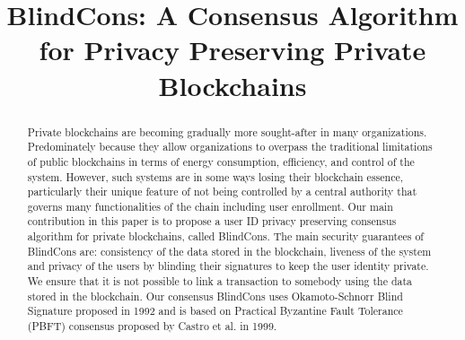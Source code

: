 \documentclass[conference]{IEEEtran}
\newcommand{\name}{BlindCons}
\begin{document}
\title{\name{}: A Consensus Algorithm for Privacy Preserving Private Blockchains\\}

\author{
\and
{}
\and
{}
\and
{}
}

\maketitle


\begin{abstract}
Private blockchains are becoming gradually more sought-after in many organizations. Predominately because they allow organizations to overpass the traditional limitations of public blockchains in terms of energy consumption, efficiency, and control of the system. However, such systems are in some ways losing their blockchain essence, particularly their unique feature of not being controlled by a central authority that governs many functionalities of the chain including user enrollment. Our main contribution in this paper is to propose a user ID privacy preserving consensus algorithm for private blockchains, called \name{}. The main security guarantees of \name{} are:  consistency of the data stored in the blockchain, liveness of the system and privacy of the users by blinding their signatures to keep the user identity private. We ensure that it is not possible to link a transaction to somebody using the data stored in the blockchain. Our consensus \name{} uses Okamoto-Schnorr Blind Signature proposed in 1992 and is based on Practical Byzantine Fault Tolerance (PBFT) consensus proposed by Castro et al. in 1999. 
\end{abstract}
\end{document}
